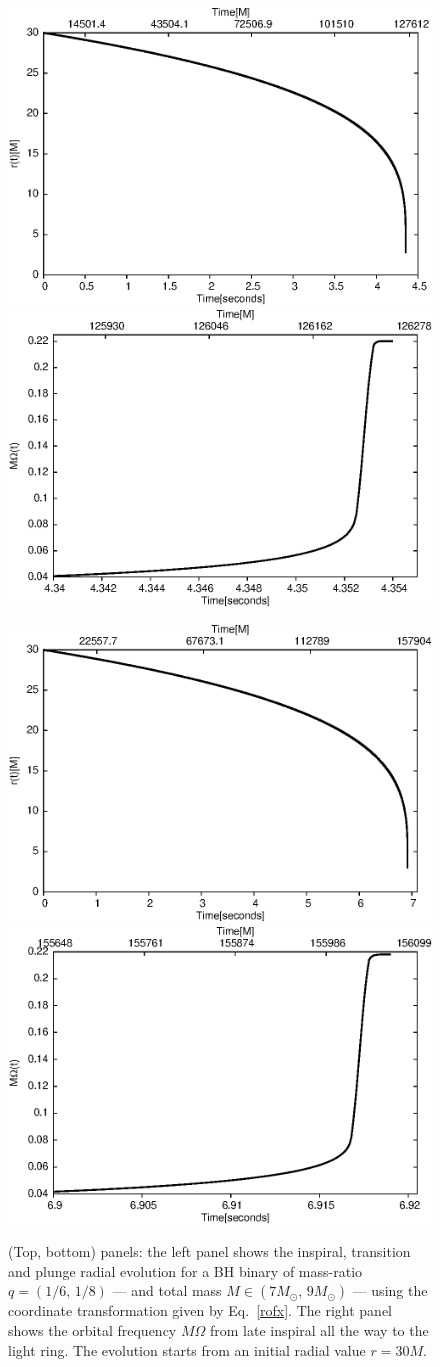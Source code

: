 \begin{figure}[ht]
\centerline{
\includegraphics[height=0.4\textwidth,  clip]{figures/imrimri/rvstm1m6.eps}
\includegraphics[height=0.4\textwidth,  clip]{figures/imrimri/xvsMOmegam1m6.eps}
}
\centerline{
\includegraphics[height=0.4\textwidth,  clip]{figures/imrimri/rvstm1m8.eps}
\includegraphics[height=0.4\textwidth,  clip]{figures/imrimri/xvsMOmegam1m8.eps}
}
\caption{(Top, bottom) panels: the left panel shows the inspiral, transition and plunge radial evolution for a BH binary of mass-ratio \(q=(1/6,\,1/8)\) --- and total mass \(M\in (7M_{\odot} ,\, 9M_{\odot} )\) --- using the coordinate transformation given by Eq.~\eqref{rofx}. The right panel shows the orbital frequency \(M\Omega\) from late inspiral all the way to the light ring. The evolution starts from an initial radial value \(r=30M\).}
\label{IP}
\end{figure}

